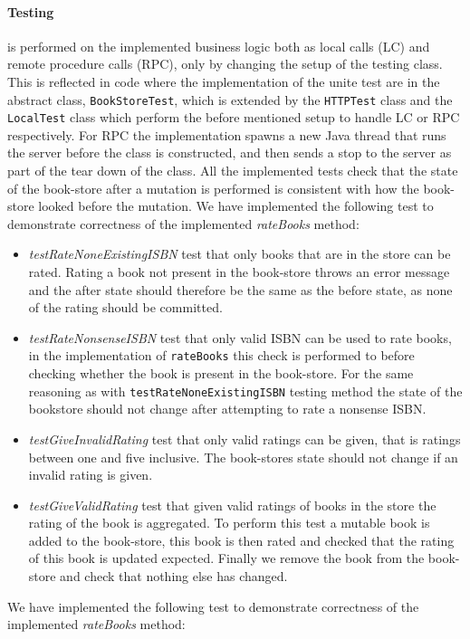 \documentclass[a4paper]{article}
\begin{document}
\paragraph{Testing} is performed on the implemented business logic both as local calls (LC) and remote procedure calls (RPC), only by changing the setup of the testing class. This is reflected in code where the implementation of the unite test are in the abstract class, \texttt{BookStoreTest}, which is extended by the \texttt{HTTPTest} class and the \texttt{LocalTest} class which perform the before mentioned setup to handle LC or RPC respectively. For RPC the implementation spawns a new Java thread that runs the server before the class is constructed, and then sends a stop to the server as part of the tear down of the class. All the implemented tests check that the state of the book-store after a mutation is performed is consistent with how the book-store looked before the mutation.
We have implemented the following test to demonstrate correctness of the implemented \textit{rateBooks} method:
\begin{itemize}
\item \textit{testRateNoneExistingISBN} test that only books that are in the store can be rated. Rating a book not present in the book-store throws an error message and the after state should therefore be the same as the before state, as none of the rating should be committed.
\item \textit{testRateNonsenseISBN} test that only valid ISBN can be used to rate books, in the implementation of \texttt{rateBooks} this check is performed to before checking whether the book is present in the book-store. For the same reasoning as with \texttt{testRateNoneExistingISBN} testing method the state of the bookstore should not change after attempting to rate a nonsense ISBN.
\item \textit{testGiveInvalidRating} test that only valid ratings can be given, that is ratings between one and five inclusive. The book-stores state should not change if an invalid rating is given.
\item \textit{testGiveValidRating} test that given valid ratings of books in the store the rating of the book is aggregated. To perform this test a mutable book is added to the book-store, this book is then rated and checked that the rating of this book is updated expected. Finally we remove the book from the book-store and check that nothing else has changed.
\end{itemize}
We have implemented the following test to demonstrate correctness of the implemented \textit{rateBooks} method:
\end{document}
